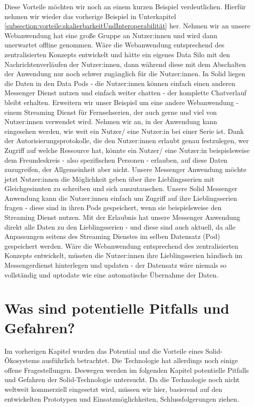 \documentclass[acmtog]{acmart}
\begin{document}
Diese Vorteile möchten wir noch an einem kurzen Beispiel verdeutlichen. Hierfür nehmen wir wieder das vorherige Beispiel in Unterkapitel \ref{subsection:vorteile:skalierbarkeitUndInteroperabilität} her. 
Nehmen wir an unsere Webanwendung hat eine große Gruppe an Nutzer:innen und wird dann unerwartet offline genommen. Wäre die Webanwendung entsprechend des zentralisierten Konzepts entwickelt und hätte ein eigenes Data Silo mit den Nachrichtenverläufen der Nutzer:innen, dann während diese mit dem Abschalten der Anwendung nur noch schwer zugänglich für die Nutzer:innen. In Solid liegen die Daten in den Data Pods - die Nutzer:innen können einfach einen anderen Messenger Dienst nutzen und einfach weiter chatten - der komplette Chatverlauf bleibt erhalten.
Erweitern wir unser Beispiel um eine andere Webanwendung - einem Streaming Dienst für Fernsehserien, der auch gerne und viel von Nutzer:innen verwendet wird. Nehmen wir an, in der Anwendung kann eingesehen werden, wie weit ein Nutzer/ eine Nutzer:in bei einer Serie ist. Dank der Autorisierungsprotokolle, die den Nutzer:innen erlaubt genau festzulegen, wer Zugriff auf welche Ressource hat, könnte ein Nutzer/ eine Nutzer:in beispielsweise dem Freundeskreis - also spezifischen Personen - erlauben, auf diese Daten zuzugreifen, der Allgemeinheit aber nicht. 
Unsere Messenger Anwendung möchte jetzt Nutzer:innen die Möglichkeit geben über ihre Lieblingsserien mit Gleichgesinnten zu schreiben und sich auszutauschen. Unsere Solid Messenger Anwendung kann die Nutzer:innen einfach um Zugriff auf ihre Lieblingsserien fragen - diese sind in ihren Pods gespeichert, wenn sie beispielsweise den Streaming Dienst nutzen. Mit der Erlaubnis hat unsere Messenger Anwendung direkt alle Daten zu den Lieblingsserien - und diese sind auch aktuell, da alle Anpassungen seitens des Streaming Dienstes im selben Datensatz (Pod) gespeichert werden. Wäre die Webanwendung entsprechend des zentralisierten Konzepts entwickelt, müssten die Nutzer:innen ihre Lieblingsserien händisch im Messengerdienst hinterlegen und updaten - der Datensatz wäre niemals so vollständig und uptodate wie eine automatische Übernahme der Daten.

\section{Was sind potentielle Pitfalls und Gefahren?} \label{section:wasSindPotentiellePitfallsUndGefahren}

Im vorherigen Kapitel wurden das Potential und die Vorteile eines Solid-Ökosystems ausführlich betrachtet. Die Technologie hat allerdings noch einige offene Fragestellungen. Deswegen werden im folgenden Kapitel potentielle Pitfalls und Gefahren der Solid-Technologie untersucht. Da die Technologie noch nicht weltweit kommerziell eingesetzt wird, müssen wir hier, basierend auf den entwickelten Prototypen und Einsatzmöglichkeiten, Schlussfolgerungen ziehen.
\end{document}
